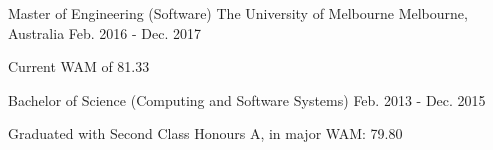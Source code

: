 \begin{cventries}
  \cventrydouble
    {Master of Engineering (Software)}
    {The University of Melbourne}
    {Melbourne, Australia}
    {Feb. 2016 - Dec. 2017}
    {
      \begin{cvitems}
        \item {Current WAM of 81.33}
      \end{cvitems}
    }
    {Bachelor of Science (Computing and Software Systems)}
    {Feb. 2013 - Dec. 2015}
    {
      \begin{cvitems}
        \item {Graduated with Second Class Honours A, in major WAM: 79.80}
      \end{cvitems}
    }
\end{cventries}
